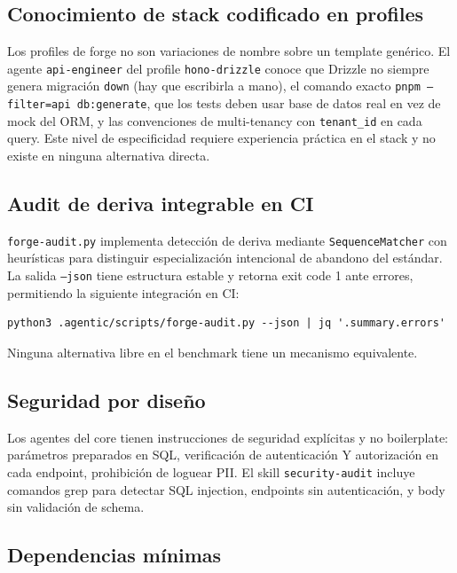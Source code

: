 \documentclass[11pt,a4paper]{article}
\begin{document}
\subsection{Conocimiento de stack codificado en profiles}

Los profiles de forge no son variaciones de nombre sobre un template genérico. El agente \texttt{api-engineer} del profile \texttt{hono-drizzle} conoce que Drizzle no siempre genera migración \texttt{down} (hay que escribirla a mano), el comando exacto \texttt{pnpm --filter=api db:generate}, que los tests deben usar base de datos real en vez de mock del ORM, y las convenciones de multi-tenancy con \texttt{tenant\_id} en cada query. Este nivel de especificidad requiere experiencia práctica en el stack y no existe en ninguna alternativa directa.

\subsection{Audit de deriva integrable en CI}

\texttt{forge-audit.py} implementa detección de deriva mediante \texttt{SequenceMatcher} con heurísticas para distinguir especialización intencional de abandono del estándar. La salida \texttt{--json} tiene estructura estable y retorna exit code 1 ante errores, permitiendo la siguiente integración en CI:

\begin{verbatim}
python3 .agentic/scripts/forge-audit.py --json | jq '.summary.errors'
\end{verbatim}

Ninguna alternativa libre en el benchmark tiene un mecanismo equivalente.

\subsection{Seguridad por diseño}

Los agentes del core tienen instrucciones de seguridad explícitas y no boilerplate: parámetros preparados en SQL, verificación de autenticación Y autorización en cada endpoint, prohibición de loguear PII. El skill \texttt{security-audit} incluye comandos grep para detectar SQL injection, endpoints sin autenticación, y body sin validación de schema.

\subsection{Dependencias mínimas}
\end{document}
